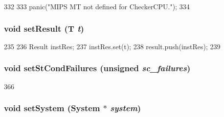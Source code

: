 \begin{DoxyCode}
332     {
333         panic("MIPS MT not defined for CheckerCPU.\n");
334     }
\end{DoxyCode}
\hypertarget{classCheckerCPU_accfdfc918ee73975e86b08cf8a528479}{
\subsubsection[{setResult}]{\setlength{\rightskip}{0pt plus 5cm}void setResult (T {\em t})}}
\label{classCheckerCPU_accfdfc918ee73975e86b08cf8a528479}



\begin{DoxyCode}
235     {
236         Result instRes;
237         instRes.set(t);
238         result.push(instRes);
239     }
\end{DoxyCode}
\hypertarget{classCheckerCPU_abbe779fa43c72cd485ddb736ab17ff61}{
\subsubsection[{setStCondFailures}]{\setlength{\rightskip}{0pt plus 5cm}void setStCondFailures (unsigned {\em sc\_\-failures})}}
\label{classCheckerCPU_abbe779fa43c72cd485ddb736ab17ff61}



\begin{DoxyCode}
366     {}
\end{DoxyCode}
\hypertarget{classCheckerCPU_a87165dd3c0f61d17b5decfdd925b3fcd}{
\subsubsection[{setSystem}]{\setlength{\rightskip}{0pt plus 5cm}void setSystem ({\bf System} $\ast$ {\em system})}}
\label{classCheckerCPU_a87165dd3c0f61d17b5decfdd925b3fcd}



